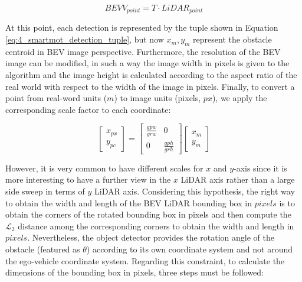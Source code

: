 \begin{equation}
	\label{eq:4_smartmot_rw_to_image_apply_transform}
	BEVV_{point} = T \cdot LiDAR_{point}
\end{equation}

At this point, each detection is represented by the tuple shown in Equation \ref{eq:4_smartmot_detection_tuple}, but now \textit{$x_{m},y_{m}$} represent the obstacle centroid in \ac{BEV} image perspective. Furthermore, the resolution of the \ac{BEV} image can be modified, in such a way the image width in pixels is given to the algorithm and the image height is calculated according to the aspect ratio of the real world with respect to the width of the image in pixels. Finally, to convert a point from real-word units ($\textit{m}$) to image units (pixels, $\textit{px}$), we apply the corresponding scale factor to each coordinate:

\begin{equation}
	\label{eq:4_conversion_meter2px}
	\left[ \begin{array}{c}
		x_{px}  \\
		y_{pc} \end{array} \right] 
	=
	\left[ \begin{array}{cc}
		\frac{gpw}{grw} & 0  \\
		0 & \frac{gph}{grh} \end{array} \right]
	\left[ \begin{array}{c}
		x_{m}  \\
		y_{m} \end{array} \right] 
\end{equation}

However, it is very common to have different scales for $\textit{x}$ and $\textit{y}$-axis since it is more interesting to have a further view in the $\textit{x}$ \ac{LiDAR} axis rather than a large side sweep in terms of $\textit{y}$ \ac{LiDAR} axis. Considering this hypothesis, the right way to obtain the width and length of the \ac{BEV} \ac{LiDAR} bounding box in $\textit{pixels}$ is to obtain the corners of the rotated bounding box in pixels and then compute the $\mathcal{L}_2$ distance among the corresponding corners to obtain the width and length in $\textit{pixels}$. Nevertheless, the object detector provides the rotation angle of the obstacle (featured as $\theta$) according to its own coordinate system and not around the ego-vehicle coordinate system. Regarding this constraint, to calculate the dimensions of the bounding box in pixels, three steps must be followed:

